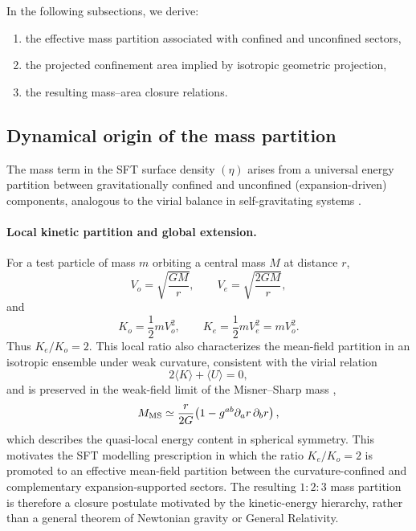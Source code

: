 \documentclass[12pt]{article}
\begin{document}
In the following subsections, we derive:
\begin{enumerate}
\item the effective mass partition associated with confined and unconfined sectors,
\item the projected confinement area implied by isotropic geometric projection,
\item the resulting mass--area closure relations.
\end{enumerate}


\subsection{Dynamical origin of the mass partition}

The mass term in the SFT surface density $(\eta)$
arises from a universal energy partition between gravitationally confined and
unconfined (expansion-driven) components, analogous to the virial balance in
self-gravitating systems \cite{Chandrasekhar1967,Weinberg1972,BinneyTremaine2008}.

\paragraph{Local kinetic partition and global extension.}
For a test particle of mass \(m\) orbiting a central mass \(M\) at distance \(r\),
\[
V_o = \sqrt{\frac{GM}{r}}, \qquad V_e = \sqrt{\frac{2GM}{r}},
\]
and
\[
K_o = \frac{1}{2}mV_o^2, \qquad K_e = \frac{1}{2}mV_e^2 = mV_o^2.
\]
Thus \(K_e/K_o = 2.\) This local ratio also characterizes the mean-field partition
in an isotropic ensemble under weak curvature, consistent with the virial relation
\begin{equation}
2\langle K\rangle + \langle U\rangle = 0,
\label{eq:virial}
\end{equation}
and is preserved in the weak-field limit of the Misner–Sharp mass
\cite{MisnerSharp1964,MaedaNozawa2008,Hayward1996},
\[
M_{\rm MS} \simeq \frac{r}{2G}\!\left(1 - g^{ab}\partial_a r\,\partial_b r\right),
\]
which describes the quasi-local energy content in spherical symmetry.
This motivates the SFT modelling prescription in which the ratio
\(K_e/K_o=2\) is promoted to an effective mean-field partition between
the curvature-confined and complementary expansion-supported sectors.
The resulting \(1{:}2{:}3\) mass partition is therefore a closure
postulate motivated by the kinetic-energy hierarchy, rather than a
general theorem of Newtonian gravity or General Relativity.
\end{document}
